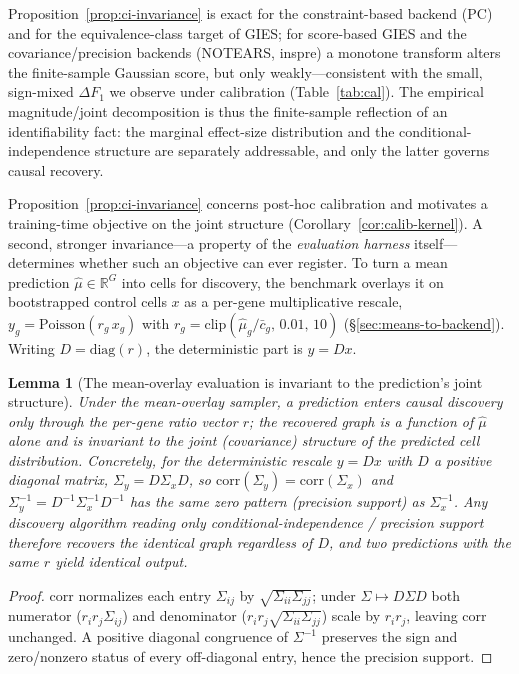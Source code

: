 \documentclass{article}
\theoremstyle{plain}
\newtheorem{lemma}[theorem]{Lemma}
\theoremstyle{definition}
\theoremstyle{remark}
\begin{document}
Proposition~\ref{prop:ci-invariance} is exact for the constraint-based backend (PC) and for the equivalence-class target of GIES; for score-based GIES and the covariance/precision backends (NOTEARS, inspre) a monotone transform alters the finite-sample Gaussian score, but only weakly---consistent with the small, sign-mixed $\Delta F_1$ we observe under calibration (Table~\ref{tab:cal}). The empirical magnitude/joint decomposition is thus the finite-sample reflection of an identifiability fact: the marginal effect-size distribution and the conditional-independence structure are separately addressable, and only the latter governs causal recovery.

Proposition~\ref{prop:ci-invariance} concerns post-hoc calibration and motivates a training-time objective on the joint structure (Corollary~\ref{cor:calib-kernel}). A second, stronger invariance---a property of the \emph{evaluation harness} itself---determines whether such an objective can ever register. To turn a mean prediction $\hat\mu\in\mathbb{R}^G$ into cells for discovery, the benchmark overlays it on bootstrapped control cells $x$ as a per-gene multiplicative rescale, $y_g = \mathrm{Poisson}(r_g\,x_g)$ with $r_g=\mathrm{clip}(\hat\mu_g/\bar c_g,\,0.01,\,10)$ (\S\ref{sec:means-to-backend}). Writing $D=\mathrm{diag}(r)$, the deterministic part is $y=Dx$.

\begin{lemma}[The mean-overlay evaluation is invariant to the prediction's joint structure]
\label{lem:overlay-invariance}
Under the mean-overlay sampler, a prediction enters causal discovery only through the per-gene ratio vector $r$; the recovered graph is a function of $\hat\mu$ alone and is invariant to the joint (covariance) structure of the predicted cell distribution. Concretely, for the deterministic rescale $y=Dx$ with $D$ a positive diagonal matrix, $\Sigma_y = D\Sigma_x D$, so $\mathrm{corr}(\Sigma_y)=\mathrm{corr}(\Sigma_x)$ and $\Sigma_y^{-1}=D^{-1}\Sigma_x^{-1}D^{-1}$ has the same zero pattern (precision support) as $\Sigma_x^{-1}$. Any discovery algorithm reading only conditional-independence / precision support therefore recovers the identical graph regardless of $D$, and two predictions with the same $r$ yield identical output.
\end{lemma}

\begin{proof}
$\mathrm{corr}$ normalizes each entry $\Sigma_{ij}$ by $\sqrt{\Sigma_{ii}\Sigma_{jj}}$; under $\Sigma\mapsto D\Sigma D$ both numerator ($r_ir_j\Sigma_{ij}$) and denominator ($r_ir_j\sqrt{\Sigma_{ii}\Sigma_{jj}}$) scale by $r_ir_j$, leaving $\mathrm{corr}$ unchanged. A positive diagonal congruence of $\Sigma^{-1}$ preserves the sign and zero/nonzero status of every off-diagonal entry, hence the precision support. \end{proof}
\end{document}
